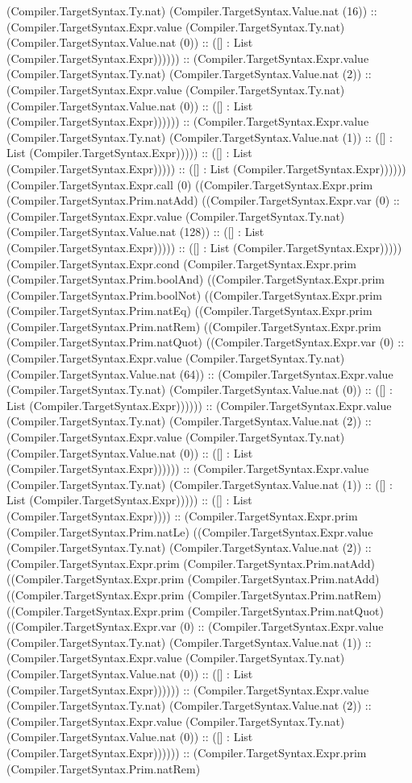 \documentclass[11pt]{article}
\begin{document}
(Compiler.TargetSyntax.Ty.nat) (Compiler.TargetSyntax.Value.nat (16)) :: (Compiler.TargetSyntax.Expr.value (Compiler.TargetSyntax.Ty.nat) (Compiler.TargetSyntax.Value.nat (0)) :: ([] : List (Compiler.TargetSyntax.Expr)))))) :: (Compiler.TargetSyntax.Expr.value (Compiler.TargetSyntax.Ty.nat) (Compiler.TargetSyntax.Value.nat (2)) :: (Compiler.TargetSyntax.Expr.value (Compiler.TargetSyntax.Ty.nat) (Compiler.TargetSyntax.Value.nat (0)) :: ([] : List (Compiler.TargetSyntax.Expr)))))) :: (Compiler.TargetSyntax.Expr.value (Compiler.TargetSyntax.Ty.nat) (Compiler.TargetSyntax.Value.nat (1)) :: ([] : List (Compiler.TargetSyntax.Expr))))) :: ([] : List (Compiler.TargetSyntax.Expr))))) :: ([] : List (Compiler.TargetSyntax.Expr)))))) (Compiler.TargetSyntax.Expr.call (0) ((Compiler.TargetSyntax.Expr.prim (Compiler.TargetSyntax.Prim.natAdd) ((Compiler.TargetSyntax.Expr.var (0) :: (Compiler.TargetSyntax.Expr.value (Compiler.TargetSyntax.Ty.nat) (Compiler.TargetSyntax.Value.nat (128)) :: ([] : List (Compiler.TargetSyntax.Expr))))) :: ([] : List (Compiler.TargetSyntax.Expr))))) (Compiler.TargetSyntax.Expr.cond (Compiler.TargetSyntax.Expr.prim (Compiler.TargetSyntax.Prim.boolAnd) ((Compiler.TargetSyntax.Expr.prim (Compiler.TargetSyntax.Prim.boolNot) ((Compiler.TargetSyntax.Expr.prim (Compiler.TargetSyntax.Prim.natEq) ((Compiler.TargetSyntax.Expr.prim (Compiler.TargetSyntax.Prim.natRem) ((Compiler.TargetSyntax.Expr.prim (Compiler.TargetSyntax.Prim.natQuot) ((Compiler.TargetSyntax.Expr.var (0) :: (Compiler.TargetSyntax.Expr.value (Compiler.TargetSyntax.Ty.nat) (Compiler.TargetSyntax.Value.nat (64)) :: (Compiler.TargetSyntax.Expr.value (Compiler.TargetSyntax.Ty.nat) (Compiler.TargetSyntax.Value.nat (0)) :: ([] : List (Compiler.TargetSyntax.Expr)))))) :: (Compiler.TargetSyntax.Expr.value (Compiler.TargetSyntax.Ty.nat) (Compiler.TargetSyntax.Value.nat (2)) :: (Compiler.TargetSyntax.Expr.value (Compiler.TargetSyntax.Ty.nat) (Compiler.TargetSyntax.Value.nat (0)) :: ([] : List (Compiler.TargetSyntax.Expr)))))) :: (Compiler.TargetSyntax.Expr.value (Compiler.TargetSyntax.Ty.nat) (Compiler.TargetSyntax.Value.nat (1)) :: ([] : List (Compiler.TargetSyntax.Expr))))) :: ([] : List (Compiler.TargetSyntax.Expr)))) :: (Compiler.TargetSyntax.Expr.prim (Compiler.TargetSyntax.Prim.natLe) ((Compiler.TargetSyntax.Expr.value (Compiler.TargetSyntax.Ty.nat) (Compiler.TargetSyntax.Value.nat (2)) :: (Compiler.TargetSyntax.Expr.prim (Compiler.TargetSyntax.Prim.natAdd) ((Compiler.TargetSyntax.Expr.prim (Compiler.TargetSyntax.Prim.natAdd) ((Compiler.TargetSyntax.Expr.prim (Compiler.TargetSyntax.Prim.natRem) ((Compiler.TargetSyntax.Expr.prim (Compiler.TargetSyntax.Prim.natQuot) ((Compiler.TargetSyntax.Expr.var (0) :: (Compiler.TargetSyntax.Expr.value (Compiler.TargetSyntax.Ty.nat) (Compiler.TargetSyntax.Value.nat (1)) :: (Compiler.TargetSyntax.Expr.value (Compiler.TargetSyntax.Ty.nat) (Compiler.TargetSyntax.Value.nat (0)) :: ([] : List (Compiler.TargetSyntax.Expr)))))) :: (Compiler.TargetSyntax.Expr.value (Compiler.TargetSyntax.Ty.nat) (Compiler.TargetSyntax.Value.nat (2)) :: (Compiler.TargetSyntax.Expr.value (Compiler.TargetSyntax.Ty.nat) (Compiler.TargetSyntax.Value.nat (0)) :: ([] : List (Compiler.TargetSyntax.Expr)))))) :: (Compiler.TargetSyntax.Expr.prim (Compiler.TargetSyntax.Prim.natRem) 
\end{document}
